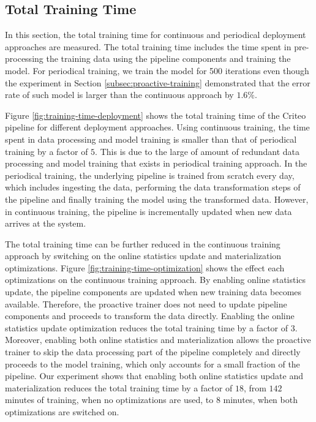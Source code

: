 \subsection{Total Training Time}
In this section, the total training time for continuous and periodical deployment approaches are measured.
The total training time includes the time spent in pre-processing the training data using the pipeline components and training the model.
For periodical training, we train the model for 500 iterations even though the experiment in Section \ref{subsec:proactive-training} demonstrated that the error rate of such model is larger than the continuous approach by $1.6\%$.

Figure \ref{fig:training-time-deployment} shows the total training time of the Criteo pipeline for different deployment approaches.
Using continuous training, the time spent in data processing and model training is smaller than that of periodical training by a factor of $5$.
This is due to the large of amount of redundant data processing and model training that exists in periodical training approach.
In the periodical training, the underlying pipeline is trained from scratch every day, which includes ingesting the data, performing the data transformation steps of the pipeline and finally training the model using the transformed data.
However, in continuous training, the pipeline is incrementally updated when new data arrives at the system.

The total training time can be further reduced in the continuous training approach by switching on the online statistics update and materialization optimizations.
Figure \ref{fig:training-time-optimization} shows the effect each optimizations on the continuous training approach.
By enabling online statistics update, the pipeline components are updated when new training data becomes available.
Therefore, the proactive trainer does not need to update pipeline components and proceeds to transform the data directly.
Enabling the online statistics update optimization reduces the total training time by a factor of $3$.
Moreover, enabling both online statistics and materialization allows the proactive trainer to skip the data processing part of the pipeline completely and directly proceeds to the model training, which only accounts for a small fraction of the pipeline.
Our experiment shows that enabling both online statistics update and materialization reduces the total training time by a factor of $18$, from $142$ minutes of training, when no optimizations are used, to $8$ minutes, when both optimizations are switched on.

